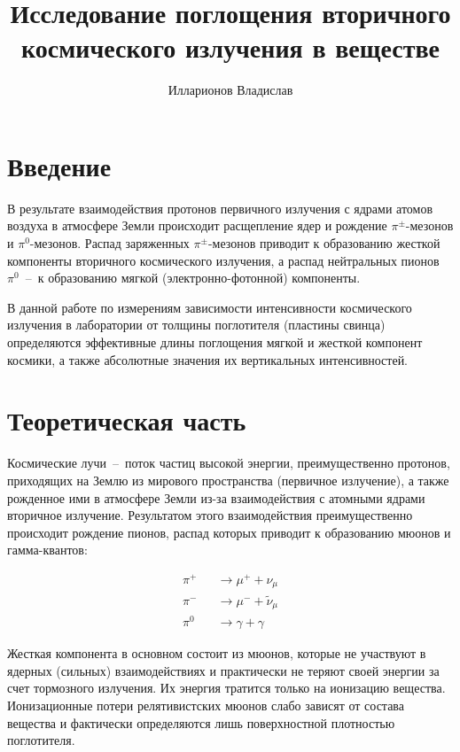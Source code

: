 \documentclass[reprint, nofootinbib, nobalancelastpage, 10pt]{revtex4-2}
\begin{document}
\title{Исследование поглощения вторичного космического излучения в веществе}
\author{Илларионов Владислав}

\maketitle


\section*{Введение}

В результате взаимодействия протонов первичного излучения с ядрами атомов воздуха в
атмосфере Земли происходит расщепление ядер и рождение $\pi^{\pm}$-мезонов и
$\pi^0$-мезонов. Распад заряженных $\pi^{\pm}$-мезонов приводит к образованию жесткой
компоненты вторичного космического излучения, а распад нейтральных пионов $\pi^0$~--~к
образованию мягкой (электронно-фотонной) компоненты.

В данной работе по измерениям зависимости интенсивности космического излучения в
лаборатории от толщины поглотителя (пластины свинца) определяются эффективные длины
поглощения мягкой и жесткой компонент космики, а также абсолютные значения их вертикальных
интенсивностей.


\section*{Теоретическая часть}

Космические лучи~--~поток частиц высокой энергии, преимущественно протонов, приходящих
на Землю из мирового пространства (первичное излучение), а также рожденное ими в атмосфере
Земли из-за взаимодействия с атомными ядрами вторичное излучение. Результатом этого
взаимодействия преимущественно происходит рождение пионов, распад которых приводит к
образованию мюонов и гамма-квантов:

\begin{eqnarray*}
	\pi^+ &&\rightarrow \mu^+ + \nu_{\mu} \\
	\pi^- &&\rightarrow \mu^- + \widetilde{\nu}_{\mu} \\
	\pi^0 &&\rightarrow \gamma + \gamma
\end{eqnarray*}

Жесткая компонента в основном состоит из мюонов, которые не участвуют в ядерных (сильных)
взаимодействиях и практически не теряют своей энергии за счет тормозного излучения. Их
энергия тратится только на ионизацию вещества. Ионизационные потери релятивистских мюонов
слабо зависят от состава вещества и фактически определяются лишь поверхностной плотностью
поглотителя.
\end{document}
